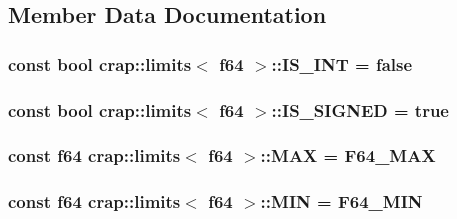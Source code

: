 \subsection{Member Data Documentation}
\hypertarget{structcrap_1_1limits_3_01f64_01_4_a1aea3bbcfe3342c3105af4913b439c7e}{
\subsubsection[{I\-S\-\_\-\-I\-N\-T}]{\setlength{\rightskip}{0pt plus 5cm}const bool {\bf crap\-::limits}$<$ {\bf f64} $>$\-::I\-S\-\_\-\-I\-N\-T = false\hspace{0.3cm}{\ttfamily [static]}}}\label{structcrap_1_1limits_3_01f64_01_4_a1aea3bbcfe3342c3105af4913b439c7e}
\hypertarget{structcrap_1_1limits_3_01f64_01_4_a746e4464e01c3ddb2fca1ed15d66e8f5}{
\subsubsection[{I\-S\-\_\-\-S\-I\-G\-N\-E\-D}]{\setlength{\rightskip}{0pt plus 5cm}const bool {\bf crap\-::limits}$<$ {\bf f64} $>$\-::I\-S\-\_\-\-S\-I\-G\-N\-E\-D = true\hspace{0.3cm}{\ttfamily [static]}}}\label{structcrap_1_1limits_3_01f64_01_4_a746e4464e01c3ddb2fca1ed15d66e8f5}
\hypertarget{structcrap_1_1limits_3_01f64_01_4_aaffd447f57d01908c6549471a875b43c}{
\subsubsection[{M\-A\-X}]{\setlength{\rightskip}{0pt plus 5cm}const {\bf f64} {\bf crap\-::limits}$<$ {\bf f64} $>$\-::M\-A\-X = {\bf F64\-\_\-\-M\-A\-X}\hspace{0.3cm}{\ttfamily [static]}}}\label{structcrap_1_1limits_3_01f64_01_4_aaffd447f57d01908c6549471a875b43c}
\hypertarget{structcrap_1_1limits_3_01f64_01_4_a1f7e2f5b5f8d1e47cbb95028a5dcc73a}{
\subsubsection[{M\-I\-N}]{\setlength{\rightskip}{0pt plus 5cm}const {\bf f64} {\bf crap\-::limits}$<$ {\bf f64} $>$\-::M\-I\-N = {\bf F64\-\_\-\-M\-I\-N}\hspace{0.3cm}{\ttfamily [static]}}}\label{structcrap_1_1limits_3_01f64_01_4_a1f7e2f5b5f8d1e47cbb95028a5dcc73a}


